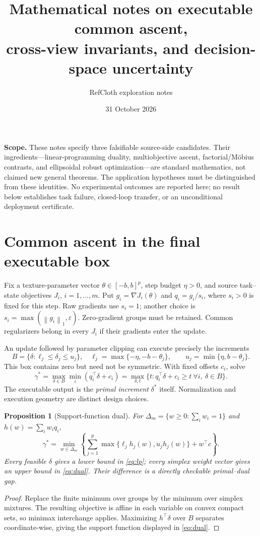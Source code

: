 \documentclass[10pt,a4paper]{article}
\title{Mathematical notes on executable common ascent,\protect\\
cross-view invariants, and decision-space uncertainty}
\author{RefCloth exploration notes}
\date{31 October 2026}
\newtheorem{proposition}{Proposition}[section]
\newcommand{\norm}[1]{\left\|#1\right\|}
\newcommand{\simplex}{\Delta_m}
\begin{document}
\maketitle
\vspace{-8pt}

\textbf{Scope.} These notes specify three falsifiable source-side candidates.
Their ingredients---linear-programming duality, multiobjective ascent,
factorial/M\"obius contrasts, and ellipsoidal robust optimization---are standard
mathematics, not claimed new general theorems. The application hypotheses must
be distinguished from these identities. No experimental outcomes are reported
here; no result below establishes task failure, closed-loop transfer, or an
unconditional deployment certificate.

\section{Common ascent in the final executable box}
Fix a texture-parameter vector $\theta\in[-b,b]^p$, step budget $\eta>0$, and
source task--state objectives $J_i$, $i=1,\ldots,m$. Put
$g_i=\nabla J_i(\theta)$ and $q_i=g_i/s_i$, where $s_i>0$ is fixed for this
step. Raw gradients use $s_i=1$; another choice is
$s_i=\max(\norm{g_i}_1,\varepsilon)$. Zero-gradient groups must be retained.
Common regularizers belong in every $J_i$ if their gradients enter the update.

An update followed by parameter clipping can execute precisely the increments
\begin{equation}\label{eq:box}
 B=\{\delta:\ell_j\leq\delta_j\leq u_j\},\quad
 \ell_j=\max\{-\eta,-b-\theta_j\},\qquad
 u_j=\min\{\eta,b-\theta_j\}.
\end{equation}
This box contains zero but need not be symmetric. With fixed offsets $c_i$, solve
\begin{equation}\label{eq:lp}
 \gamma^*=\max_{\delta\in B}\min_i(q_i^\top\delta+c_i)
 =\max_{\delta,t}\{t:q_i^\top\delta+c_i\geq t\ \forall i,\ \delta\in B\}.
\end{equation}
The executable output is the \emph{primal increment} $\delta^*$ itself.
Normalization and execution geometry are distinct design choices.

\begin{proposition}[Support-function dual]
For $\simplex=\{w\geq0:\sum_iw_i=1\}$ and $h(w)=\sum_iw_iq_i$,
\begin{equation}\label{eq:dual}
 \gamma^*=\min_{w\in\simplex}
 \left\{\sum_{j=1}^p\max\{\ell_jh_j(w),u_jh_j(w)\}+w^\top c\right\}.
\end{equation}
Every feasible $\delta$ gives a lower bound in \eqref{eq:lp}; every simplex
weight vector gives an upper bound in \eqref{eq:dual}. Their difference is a
directly checkable primal--dual gap.
\end{proposition}
\begin{proof}
Replace the finite minimum over groups by the minimum over simplex mixtures.
The resulting objective is affine in each variable on convex compact sets,
so minimax interchange applies. Maximizing $h^\top\delta$ over $B$ separates
coordinate-wise, giving the support function displayed in \eqref{eq:dual}.
\end{proof}
\end{document}
